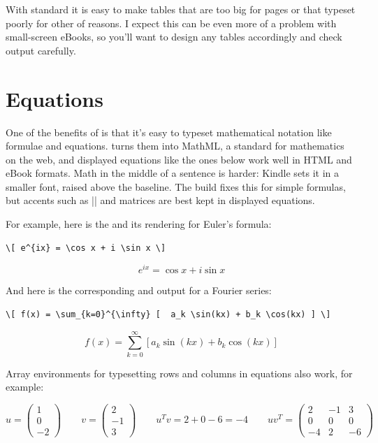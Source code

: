 With standard \latex it is easy to make tables that are too big for pages or that typeset poorly for other of reasons.
I expect this can be even more of a problem with small-screen eBooks, so you'll want to design any tables accordingly
and check output carefully.

\section{Equations}

One of the benefits of \latex is that it's easy to typeset mathematical notation like formulae and equations.
 turns them into MathML, a standard for mathematics on the web, and displayed equations
like the ones below work well in HTML and eBook formats. Math in the middle of a sentence is harder:
Kindle sets it in a smaller font, raised above the baseline. The build fixes this for simple formulas,
but accents such as \sverb|| and matrices are best kept in displayed equations.

For example, here is the \tex and its rendering for Euler's formula:

\begin{Verbatim}[fontsize=\scriptsize]
\[ e^{ix} = \cos x + i \sin x \]
\end{Verbatim}
\[ e^{ix} = \cos x + i \sin x \]

And here is the corresponding \tex and output for a Fourier series:

\begin{Verbatim}[fontsize=\scriptsize]
\[ f(x) = \sum_{k=0}^{\infty} [  a_k \sin(kx) + b_k \cos(kx) ] \]
\end{Verbatim}
\[ f(x) = \sum_{k=0}^{\infty} [  a_k \sin(kx) + b_k \cos(kx) ] \]

Array environments for typesetting rows and columns in equations also work, for example:

\[
u = \left( \begin{array}{c} 1 \\ 0 \\ -2 \end{array} \right) \qquad
v = \left( \begin{array}{c} 2 \\ -1 \\ 3 \end{array} \right) \qquad
u^T v = 2 + 0 - 6 = -4 \qquad
u v^T = \left( \begin{array}{ccc} 2 & -1 & 3 \\ 0 & 0 & 0 \\ -4 & 2 & -6 \end{array} \right)
\]

